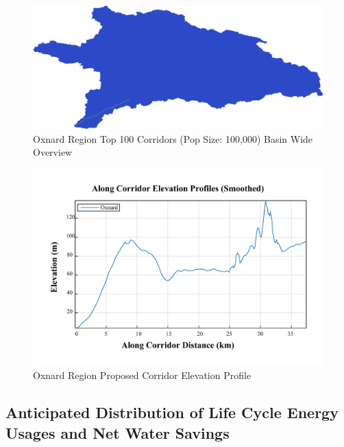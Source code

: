         \begin{figure}[!h]
            \begin{center}
            \includegraphics[width=5.5in]{figures/Oxnard_PathwayLarge.png}   
            \caption{Oxnard Region Top 100 Corridors (Pop Size: 100,000) Basin Wide Overview}
            \label{fig:OsolutionOverview}
            \end{center}
        \end{figure}
        
        \begin{figure}[!h]
            \begin{center}
            \includegraphics[width=5.5in]{figures/Oxnard_Elevation_Profile.png}
            \caption{Oxnard Region Proposed Corridor Elevation Profile}
            \label{fig:OelevationProfile}
            \end{center}
        \end{figure}
    
    \subsection{Anticipated Distribution of Life Cycle Energy Usages and Net Water Savings}    
    
